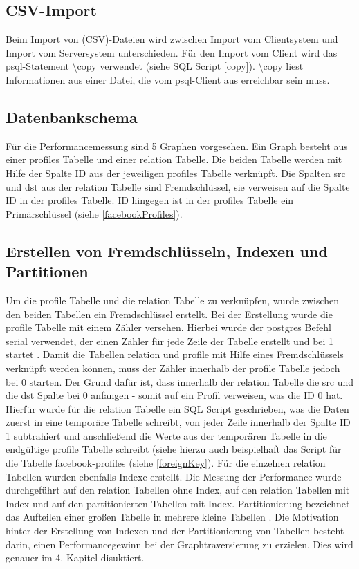 \subsection{CSV-Import}
Beim Import von (CSV)-Dateien wird zwischen Import vom Clientsystem und  Import vom Serversystem unterschieden.
Für den Import vom Client wird das psql-Statement \textbackslash copy verwendet (siehe SQL Script \ref{copy}).
\textbackslash copy liest Informationen aus einer Datei,
die vom psql-Client aus erreichbar sein muss. \cite{postgres2018}

\subsection{Datenbankschema}
Für die Performancemessung sind 5 Graphen vorgesehen. Ein Graph besteht aus einer profiles Tabelle und einer relation Tabelle. Die beiden Tabelle werden mit Hilfe der
Spalte ID aus der jeweiligen profiles Tabelle verknüpft. Die Spalten src und dst aus der relation Tabelle sind Fremdschlüssel, sie verweisen auf die Spalte ID in der
profiles Tabelle. ID hingegen ist in der profiles Tabelle ein Primärschlüssel (siehe \ref{facebookProfiles}).

\subsection{Erstellen von Fremdschlüsseln, Indexen und Partitionen}
Um die profile Tabelle und die relation Tabelle zu verknüpfen, wurde zwischen den beiden Tabellen ein Fremdschlüssel erstellt. Bei der Erstellung wurde die profile Tabelle
mit einem Zähler versehen. Hierbei wurde der postgres Befehl serial verwendet, der einen Zähler für jede Zeile der Tabelle erstellt und bei 1 startet . Damit die Tabellen
relation und profile mit Hilfe eines Fremdschlüssels verknüpft werden können, muss der Zähler innerhalb der profile Tabelle jedoch bei 0 starten. Der Grund dafür ist, dass
innerhalb der relation Tabelle die src und die dst Spalte bei 0 anfangen - somit auf ein Profil verweisen, was die ID 0 hat. Hierfür wurde für die relation Tabelle ein
SQL Script geschrieben, was die Daten zuerst in eine temporäre Tabelle schreibt, von jeder Zeile innerhalb der Spalte ID 1 subtrahiert und anschließend die Werte aus
der temporären Tabelle in die endgültige profile Tabelle schreibt (siehe hierzu auch beispielhaft das Script für die Tabelle facebook-profiles (siehe \ref{foreignKey}).
Für die einzelnen relation Tabellen wurden ebenfalls Indexe erstellt. Die Messung der Performance wurde durchgeführt auf
den relation Tabellen ohne Index, auf den relation Tabellen mit Index und auf den partitionierten Tabellen mit Index. Partitionierung bezeichnet das Aufteilen einer
großen Tabelle in mehrere kleine Tabellen \cite{postgrespartitioning} . Die Motivation hinter der Erstellung von Indexen und der Partitionierung von Tabellen besteht darin,
einen Performancegewinn bei der Graphtraversierung zu erzielen. Dies wird genauer im 4. Kapitel disuktiert.

